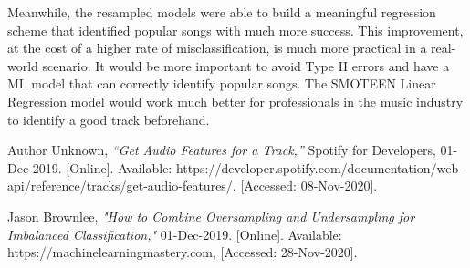 \documentclass[12pt,journal]{IEEEtran}
\begin{document}
Meanwhile, the resampled models were able to build a meaningful regression scheme that identified popular songs with much more success. This improvement, at the cost of a higher rate of misclassification, is much more practical in a real-world scenario. It would be more important to avoid Type II errors and have a ML model that can correctly identify popular songs. The SMOTEEN Linear Regression model would work much better for professionals in the music industry to identify a good track beforehand.

\begin{thebibliography}{1}

Author Unknown, \emph{“Get Audio Features for a Track,”} Spotify for Developers, 01-Dec-2019. [Online]. Available: https://developer.spotify.com/documentation/web-api/reference/tracks/get-audio-features/. [Accessed: 08-Nov-2020]. 

Jason Brownlee, \emph{"How to Combine Oversampling and Undersampling for Imbalanced Classification,"}  01-Dec-2019. [Online]. Available:  https://machinelearningmastery.com, [Accessed: 28-Nov-2020]. 
\end{thebibliography}
\end{document}
